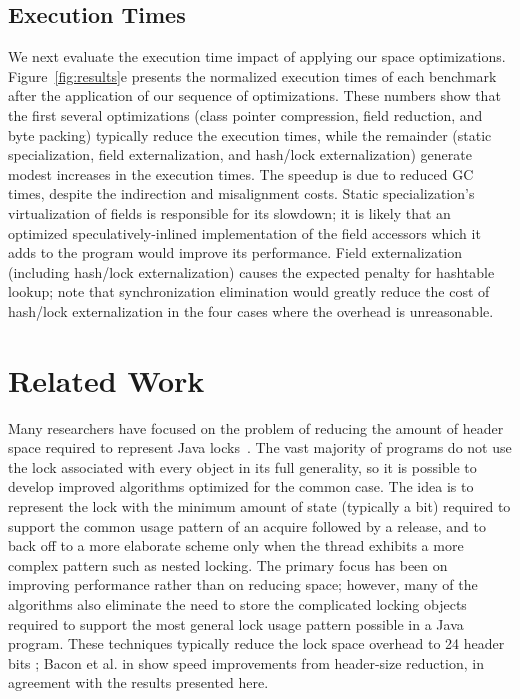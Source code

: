 \documentclass{sig-alt-full}
\begin{document}
\subsection{Execution Times} 
\label{sec:byte-pack}
%
We next evaluate the execution time impact of applying our space
optimizations. Figure~\ref{fig:results}e presents the normalized execution 
times of each benchmark after the application of our sequence
of optimizations. These numbers show that the first several
optimizations (class pointer compression, field reduction, and byte packing)
typically reduce the execution times, while the
remainder (static specialization, field externalization, and  hash/lock
externalization) generate modest increases in the execution times.
The speedup is due to reduced GC times, despite the indirection and
misalignment costs.
Static specialization's virtualization of fields is responsible for
its slowdown; it is likely that an optimized speculatively-inlined
implementation of the field accessors which it adds to the program
would improve its performance.  Field externalization (including
hash/lock externalization) causes the expected penalty for hashtable
lookup; note that synchronization elimination would greatly reduce the
cost of hash/lock externalization in the four cases where the overhead
is unreasonable.
%
%
\section{Related Work}
%
Many researchers have focused on the problem of reducing the amount of
header space required to represent Java
locks~\cite{bacon98,OK99,ADGKRW99}. The vast
majority of programs do not use the lock associated with every object
in its full generality, so it is possible to develop improved
algorithms optimized for the common case.
The idea is to represent the lock with the minimum amount
of state (typically a bit) required to support the common usage
pattern of an acquire followed by a release,
and to back off to a more elaborate scheme only when the thread
exhibits a more complex pattern such as nested locking. The
primary focus has been on improving performance rather than on
reducing space; however, many of the algorithms also eliminate the
need to store the complicated locking objects required to support the
most general lock usage pattern possible in a Java program. These
techniques typically reduce the lock space overhead to 24 header bits
\cite{bacon98}; Bacon et al. in \cite{bacon02:efficient} show speed
improvements from header-size reduction, in agreement with the results
presented here.
\end{document}
